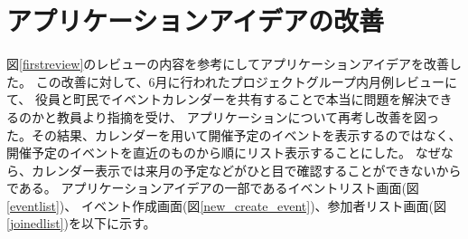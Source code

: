 \section{アプリケーションアイデアの改善}
図\ref{firstreview}のレビューの内容を参考にしてアプリケーションアイデアを改善した。
この改善に対して、6月に行われたプロジェクトグループ内月例レビューにて、
役員と町民でイベントカレンダーを共有することで本当に問題を解決できるのかと教員より指摘を受け、
アプリケーションについて再考し改善を図った。その結果、カレンダーを用いて開催予定のイベントを表示するのではなく、
開催予定のイベントを直近のものから順にリスト表示することにした。
なぜなら、カレンダー表示では来月の予定などがひと目で確認することができないからである。
アプリケーションアイデアの一部であるイベントリスト画面(図\ref{eventlist})、
イベント作成画面(図\ref{new_create_event})、参加者リスト画面(図\ref{joinedlist})を以下に示す。

